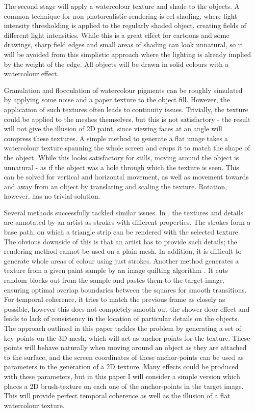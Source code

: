 \documentclass[a4paper, 12pt]{article}
\begin{document}
The second stage will apply a watercolour texture and shade to the objects. A common technique for non-photorealistic rendering is cel shading, where light intensity thresholding is applied to the regularly shaded object, creating fields of different light intensities. While this is a great effect for cartoons and some drawings, sharp field edges and small areas of shading can look unnatural, so it will be avoided from this simplistic approach where the lighting is already implied by the weight of the edge. All objects will be drawn in solid colours with a watercolour effect.

Granulation and flocculation of watercolour pigments \cite{Curtis1997} can be roughly simulated by applying some noise and a paper texture to the object fill. However, the application of such textures often leads to continuity issues. Trivially, the texture could be applied to the meshes themselves, but this is not satisfactory - the result will not give the illusion of 2D paint, since viewing faces at an angle will compress these textures. A simple method to generate a flat image takes a watercolour texture spanning the whole screen and crops it to match the shape of the object. While this looks satisfactory for stills, moving around the object is unnatural - as if the object was a hole through which the texture is seen. This can be solved for vertical and horizontal movement, as well as movement towards and away from an object by translating and scaling the texture. Rotation, however, has no trivial solution.

Several methods successfully tackled similar issues. In \cite{Kalnins2002}, the textures and details are annotated by an artist as strokes with different properties. The strokes form a base path, on which a triangle strip can be rendered with the selected texture. The obvious downside of this is that an artist has to provide such details; the rendering method cannot be used on a plain mesh. In addition, it is difficult to generate whole areas of colour using just strokes. Another method generates a texture from a given paint sample by an image quilting algorithm \cite{Kulla1989}. It cuts random blocks out from the sample and pastes them to the target image, ensuring optimal overlap boundaries between the squares for smooth transitions. For temporal coherence, it tries to match the previous frame as closely as possible, however this does not completely smooth out the shower door effect and leads to lack of consistency in the location of particular details on the objects. The approach outlined in this paper tackles the problem by generating a set of key points on the 3D mesh, which will act as anchor points for the texture. These points will behave naturally when moving around an object as they are attached to the surface, and the screen coordinates of these anchor-points can be used as parameters in the generation of a 2D texture. Many effects could be produced with these parameters, but in this paper I will consider a simple version which places a 2D brush-texture on each one of the anchor-points in the target image. This will provide perfect temporal coherence as well as the illusion of a flat watercolour texture.
\end{document}
